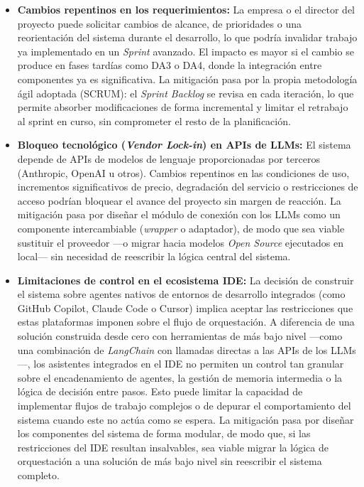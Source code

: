 \documentclass[11pt, letterpaper]{article}
\begin{document}
\begin{itemize}
    \item \textbf{Cambios repentinos en los requerimientos:} La empresa o el director del proyecto puede solicitar cambios de alcance, de prioridades o una reorientación del sistema durante el desarrollo, lo que podría invalidar trabajo ya implementado en un \textit{Sprint} avanzado. El impacto es mayor si el cambio se produce en fases tardías como DA3 o DA4, donde la integración entre componentes ya es significativa. La mitigación pasa por la propia metodología ágil adoptada (SCRUM): el \textit{Sprint Backlog} se revisa en cada iteración, lo que permite absorber modificaciones de forma incremental y limitar el retrabajo al sprint en curso, sin comprometer el resto de la planificación.

    \item \textbf{Bloqueo tecnológico (\textit{Vendor Lock-in}) en APIs de LLMs:} El sistema depende de APIs de modelos de lenguaje proporcionadas por terceros (Anthropic, OpenAI u otros). Cambios repentinos en las condiciones de uso, incrementos significativos de precio, degradación del servicio o restricciones de acceso podrían bloquear el avance del proyecto sin margen de reacción. La mitigación pasa por diseñar el módulo de conexión con los LLMs como un componente intercambiable (\textit{wrapper} o adaptador), de modo que sea viable sustituir el proveedor —o migrar hacia modelos \textit{Open Source} ejecutados en local— sin necesidad de reescribir la lógica central del sistema.

    \item \textbf{Limitaciones de control en el ecosistema IDE:} La decisión de construir el sistema sobre agentes nativos de entornos de desarrollo integrados (como GitHub Copilot, Claude Code o Cursor) implica aceptar las restricciones que estas plataformas imponen sobre el flujo de orquestación. A diferencia de una solución construida desde cero con herramientas de más bajo nivel —como una combinación de \textit{LangChain} con llamadas directas a las APIs de los LLMs—, los asistentes integrados en el IDE no permiten un control tan granular sobre el encadenamiento de agentes, la gestión de memoria intermedia o la lógica de decisión entre pasos. Esto puede limitar la capacidad de implementar flujos de trabajo complejos o de depurar el comportamiento del sistema cuando este no actúa como se espera. La mitigación pasa por diseñar los componentes del sistema de forma modular, de modo que, si las restricciones del IDE resultan insalvables, sea viable migrar la lógica de orquestación a una solución de más bajo nivel sin reescribir el sistema completo.


\end{itemize}
\end{document}
